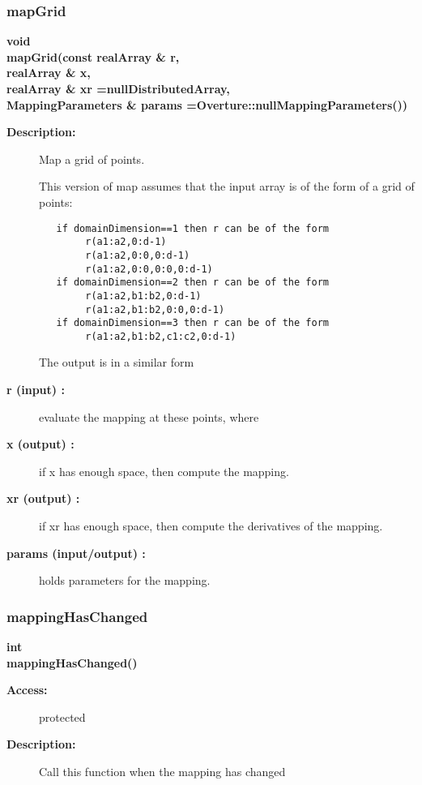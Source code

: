 \subsubsection{mapGrid}
 
\begin{flushleft} \textbf{%
void  \\ 
\settowidth{\MappingIncludeArgIndent}{mapGrid(}%
mapGrid(const realArray \& r, \\ 
\hspace{\MappingIncludeArgIndent}realArray \& x, \\ 
\hspace{\MappingIncludeArgIndent}realArray \& xr  =nullDistributedArray,\\ 
MappingParameters \& params  =Overture::nullMappingParameters())
}\end{flushleft}
\begin{description}
\item[{\bf Description:}]  Map a grid of points.
 
 This version of map assumes that the input array is of the form of a grid of points:
 \begin{verbatim}
   if domainDimension==1 then r can be of the form
        r(a1:a2,0:d-1)             
        r(a1:a2,0:0,0:d-1)        
        r(a1:a2,0:0,0:0,0:d-1)   
   if domainDimension==2 then r can be of the form
        r(a1:a2,b1:b2,0:d-1)             
        r(a1:a2,b1:b2,0:0,0:d-1)      
   if domainDimension==3 then r can be of the form
        r(a1:a2,b1:b2,c1:c2,0:d-1)      

 \end{verbatim}
 The output is in a similar form

\item[{\bf r (input) :}]  evaluate the mapping at these points, where
\item[{\bf x  (output) :}]  if x has enough space, then compute the mapping. 
\item[{\bf xr (output) :}]  if xr has enough space, then  compute the derivatives of the mapping.
\item[{\bf params (input/output) :}]  holds parameters for the mapping.
\end{description}
\subsubsection{mappingHasChanged}
 
\begin{flushleft} \textbf{%
int  \\ 
\settowidth{\MappingIncludeArgIndent}{mappingHasChanged(}%
mappingHasChanged()
}\end{flushleft}
\begin{description}
\item[{\bf Access:}]  protected
\item[{\bf Description:}] 
    Call this function when the mapping has changed 
\end{description}
